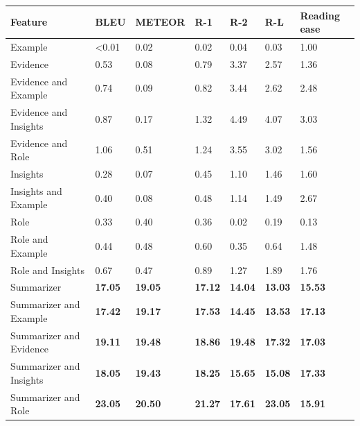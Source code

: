 \begin{tabular}{|l|l|l|l|l|l|l|}
\hline
\textbf{Feature} & BLEU & METEOR & R-1 & R-2 & R-L & Reading ease \\
 \hline
 Example & \textless{}0.01 & 0.02 & 0.02 & 0.04 & 0.03 & 1.00 \\
 \hline
 Evidence & 0.53 & 0.08 & 0.79 & 3.37 & 2.57 & 1.36 \\
 \hline
 Evidence and Example & 0.74 & 0.09 & 0.82 & 3.44 & 2.62 & 2.48 \\
 \hline
 Evidence and Insights & 0.87 & 0.17 & 1.32 & 4.49 & 4.07 & 3.03 \\
 \hline
 Evidence and Role & 1.06 & 0.51 & 1.24 & 3.55 & 3.02 & 1.56 \\
 \hline
 Insights & 0.28 & 0.07 & 0.45 & 1.10 & 1.46 & 1.60 \\
 \hline
 Insights and Example & 0.40 & 0.08 & 0.48 & 1.14 & 1.49 & 2.67 \\
 \hline
 Role & 0.33 & 0.40 & 0.36 & 0.02 & 0.19 & 0.13 \\
 \hline
 Role and Example & 0.44 & 0.48 & 0.60 & 0.35 & 0.64 & 1.48 \\
 \hline
 Role and Insights & 0.67 & 0.47 & 0.89 & 1.27 & 1.89 & 1.76 \\
 \hline
 Summarizer & \textbf{17.05} & \textbf{19.05} & \textbf{17.12} & \textbf{14.04} & \textbf{13.03} & \textbf{15.53} \\
 \hline
 Summarizer and Example & \textbf{17.42} & \textbf{19.17} & \textbf{17.53} & \textbf{14.45} & \textbf{13.53} & \textbf{17.13} \\
 \hline
 Summarizer and Evidence & \textbf{19.11} & \textbf{19.48} & \textbf{18.86} & \textbf{19.48} & \textbf{17.32} & \textbf{17.03} \\
 \hline
 Summarizer and Insights & \textbf{18.05} & \textbf{19.43} & \textbf{18.25} & \textbf{15.65} & \textbf{15.08} & \textbf{17.33} \\
 \hline
 Summarizer and Role & \textbf{23.05} & \textbf{20.50} & \textbf{21.27} & \textbf{17.61} & \textbf{23.05} & \textbf{15.91} \\
\hline
\end{tabular}
